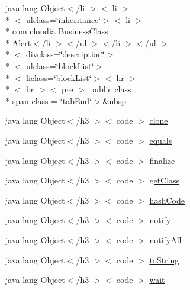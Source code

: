 \begin{DoxyCompactItemize}
 java lang Object$<$/li $>$$<$ li $>$\\*
$<$ ulclass=\char`\"{}inheritance\char`\"{}$>$$<$ li $>$\\*
 com cloudia Business\-Class \\*
\hyperlink{index-1_8html_afe3a1cf8e65b0946ddd29a67b4e60a3a}{Alert}$<$/li $>$$<$/ul $>$$<$/li $>$$<$/ul $>$\\*
$<$ divclass=\char`\"{}description\char`\"{}$>$\\*
$<$ ulclass=\char`\"{}block\-List\char`\"{}$>$\\*
$<$ liclass=\char`\"{}block\-List\char`\"{}$>$$<$ hr $>$\\*
$<$ br $>$$<$ pre $>$ public class \\*
\hyperlink{stylesheet_8css_a8343996ebcf16220b04e54659aac31cc}{span} \hyperlink{_alert_8html_a290c972cb9a60e397e66d2e329e3e475}{class} = \char`\"{}tab\-End\char`\"{}$>$\&nbsp
\item 
java lang Object$<$/h3 $>$$<$ code $>$ \hyperlink{_alert_8html_adc9607fcabf6f2d7f401ad52015ef6e0}{clone}
\item 
java lang Object$<$/h3 $>$$<$ code $>$ \hyperlink{_alert_8html_a8974318cea585f72df717e0380ec7104}{equals}
\item 
java lang Object$<$/h3 $>$$<$ code $>$ \hyperlink{_alert_8html_ab2315181ead4aeedef2374039b6ddde7}{finalize}
\item 
java lang Object$<$/h3 $>$$<$ code $>$ \hyperlink{_alert_8html_a98e6644727fe65eac217a6855045be43}{get\-Class}
\item 
java lang Object$<$/h3 $>$$<$ code $>$ \hyperlink{_alert_8html_a8e178e2bb2bef055ea23ea3910a221ca}{hash\-Code}
\item 
java lang Object$<$/h3 $>$$<$ code $>$ \hyperlink{_alert_8html_ae99ae10b5010594dbda4794e02db271b}{notify}
\item 
java lang Object$<$/h3 $>$$<$ code $>$ \hyperlink{_alert_8html_a1279357e6e09e33e75b55eb05fdb6436}{notify\-All}
\item 
java lang Object$<$/h3 $>$$<$ code $>$ \hyperlink{_alert_8html_a24c5226c4bb106e090fcda03479aab24}{to\-String}
\item 
java lang Object$<$/h3 $>$$<$ code $>$ \hyperlink{_alert_8html_a6d9f8a0d8756b0a257653394e73fa131}{wait}
\end{DoxyCompactItemize}



